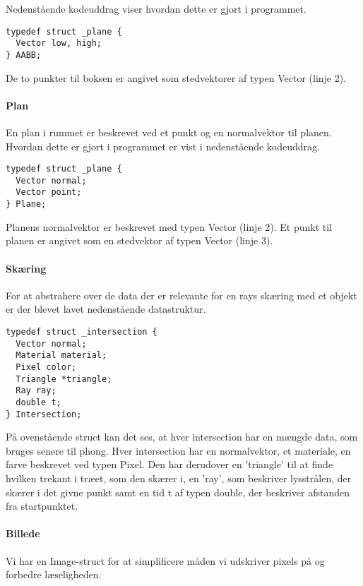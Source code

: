 Nedenstående kodeuddrag viser hvordan dette er gjort i programmet.

\begin{lstlisting}[style=Cstyle, caption=Struct til bounding boxes]
typedef struct _plane {
  Vector low, high;
} AABB;
\end{lstlisting}

De to punkter til boksen er angivet som stedvektorer af typen Vector (linje 2).

\paragraph{Plan}
En plan i rummet er beskrevet ved et punkt og en normalvektor til planen. Hvordan dette er gjort i programmet er vist i nedenstående kodeuddrag. 

\begin{lstlisting}[style=Cstyle, caption=Struct til plan]
typedef struct _plane {
  Vector normal;
  Vector point;
} Plane;
\end{lstlisting}

Planens normalvektor er beskrevet med typen Vector (linje 2). Et punkt til planen er angivet som en stedvektor af typen Vector (linje 3).

\paragraph{Skæring}
For at abstrahere over de data der er relevante for en rays skæring med et objekt er der blevet lavet nedenstående datastruktur.

\begin{lstlisting}[style=Cstyle, caption=Struct til intersection]
typedef struct _intersection {
  Vector normal;
  Material material;
  Pixel color;
  Triangle *triangle;
  Ray ray;
  double t;
} Intersection;
\end{lstlisting}

På ovenstående struct kan det ses, at hver intersection har en mængde data, som bruges senere til phong. Hver intersection har en normalvektor, et materiale, en farve beskrevet ved typen Pixel. Den har derudover en 'triangle' til at finde hvilken trekant i træet, som den skærer i, en 'ray', som beskriver lysstrålen, der skærer i det givne punkt samt en tid t af typen double, der beskriver afstanden fra startpunktet.

\paragraph{Billede}
Vi har en Image-struct for at simplificere måden vi udskriver pixels på og forbedre læseligheden.

